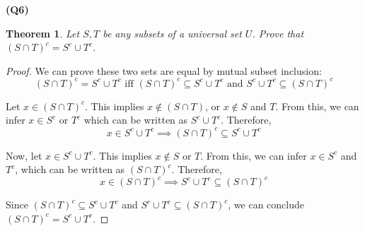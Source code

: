 \documentclass[12pt, a4paper]{article}
\newtheorem{theorem}{Theorem}
\begin{document}
\noindent\textbf{(Q6)}
\begin{theorem}
    Let $S,T$ be any subsets of a universal set $U$.
    Prove that $(S \cap T)^c = S^c \cup T^c$.
\end{theorem}

\newcommand{\A}{(S \cap T)^c}
\newcommand{\B}{S^c \cup T^c}
\newcommand{\sse}{\subseteq}

\begin{proof}
    We can prove these two sets are equal by mutual subset inclusion:
    \[
        \A = \B \text { iff } \A \sse \B \text{ and } \B \sse \A
    \]

    Let $x \in \A$. This implies $x \notin (S \cap T)$, or $x \notin S$ and $T$.
    From this, we can infer $x \in S^c$ or $T^c$ which can be written as $\B$. 
    Therefore,
    \[
        x \in \B \implies \A \sse \B
    \]

    Now, let $x \in \B$. This implies $x \notin S$ or $T$. From this, we can infer
    $x \in S^c$ and $T^c$, which can be written as $\A$. Therefore,
    \[
        x \in \A \implies \B \sse \A
    \]

    Since $\A \sse \B$ and $\B \sse \A$, we can conclude $\A = \B$.
\end{proof}
\end{document}
